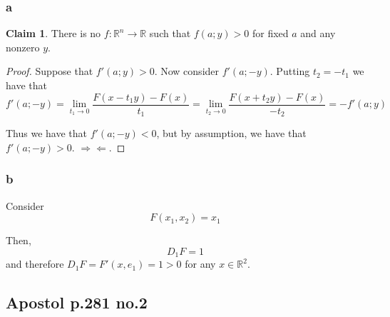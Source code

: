 \documentclass[12pt,letterpaper]{article}
\theoremstyle{definition}
\newtheorem*{claim}{Claim}
\newcommand{\contra}{\Rightarrow\!\Leftarrow}
\newcommand{\R}{\mathbb{R}}
\begin{document}
\subsubsection*{a}

\begin{claim}
  There is no $f: \R^n \rightarrow \R$ such that $f(a; y) > 0$ for fixed $a$ and
  any nonzero $y$.
\end{claim}


\begin{proof}
  Suppose that $f'(a; y) > 0$. Now consider $f'(a; -y)$. Putting $t_2 = -t_1$ we have that
  \[
    f'(a; -y) = \lim_{t_1 \rightarrow 0}\frac{F(x - t_1y) - F(x)}{t_1} = \lim_{t_2 \rightarrow
      0}\frac{F(x  + t_2y) - F(x)}{-t_2} = -f'(a; y)
  \]

  Thus we have that $f'(a; -y) < 0$, but by assumption, we have that $f'(a; -y)
  > 0$. $\contra$.
\end{proof}

\subsubsection*{b}

Consider
\[
  F(x_1, x_2) = x_1 
\]

Then,
\[
  D_1F = 1
\]
and therefore $D_1F = F'(x, e_1) = 1 > 0$ for any $x \in \R^2$.

\subsection*{Apostol p.281 no.2}
\end{document}
